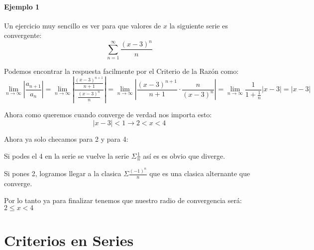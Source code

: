 \documentclass[12pt]{report}                                %
\begin{document}
        \subsubsection{Ejemplo 1}
            Un ejercicio muy sencillo es ver para que valores de $x$
            la siguiente serie es convergente:
            \begin{equation*}
               \sum_{n=1}^\infty \frac{(x-3)^n}{n}
            \end{equation*}

            Podemos encontrar la respuesta facilmente por el Criterio de la Razón como:
            \begin{equation*}
                \lim_{n \to \infty} \left| \frac{a_{n+1}}{a_n} \right| = 
                \lim_{n \to \infty} \left| \frac{\frac{(x-3)^{n+1}}{n+1}}{\frac{(x-3)^n}{n}} \right| = 
                \lim_{n \to \infty} \left| \frac{(x-3)^{n+1}}{n+1} \cdot \frac{n}{(x-3)^{n}} \right| =
                \lim_{n \to \infty} \frac{1}{1+\frac{1}{n}} |x-3| =
                |x-3|
            \end{equation*}

            Ahora como queremos cuando converge de verdad nos importa esto:
            \begin{equation*}
                |x-3| < 1 \to 2 < x < 4
            \end{equation*}

            Ahora ya solo checamos para 2 y para 4:

            Si podes el 4 en la serie se vuelve la serie $\Sigma \frac{1}{n}$ así es es obvio que diverge.

            Si pones 2, logramos llegar a la clasica $\Sigma \frac{(-1)^n}{n}$ que es una clasica
            alternante que converge.

            Por lo tanto ya para finalizar tenemos que nuestro radio de convergencia será:
            $2 \leq x < 4$








\clearpage
\chapter{Criterios en Series}
\end{document}
